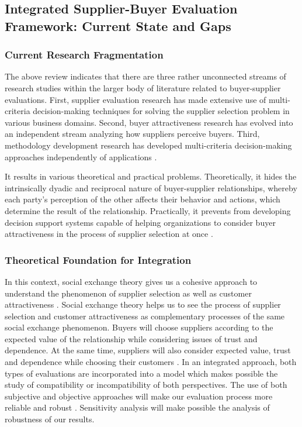 \documentclass[11pt]{article}
\begin{document}
\subsection{Integrated Supplier-Buyer Evaluation Framework: Current State and Gaps}

\subsubsection{Current Research Fragmentation}

The above review indicates that there are three rather unconnected streams of research studies within the larger body of literature related to buyer-supplier evaluations. First, supplier evaluation research has made extensive use of multi-criteria decision-making techniques for solving the supplier selection problem in various business domains. Second, buyer attractiveness research has evolved into an independent stream analyzing how suppliers perceive buyers. Third, methodology development research has developed multi-criteria decision-making approaches independently of applications \cite{ref22,ref32,ref35}.

It results in various theoretical and practical problems. Theoretically, it hides the intrinsically dyadic and reciprocal nature of buyer-supplier relationships, whereby each party's perception of the other affects their behavior and actions, which determine the result of the relationship. Practically, it prevents from developing decision support systems capable of helping organizations to consider buyer attractiveness in the process of supplier selection at once \cite{ref34,ref14}.

\subsubsection{Theoretical Foundation for Integration}

In this context, social exchange theory gives us a cohesive approach to understand the phenomenon of supplier selection as well as customer attractiveness \cite{ref33,ref34}. Social exchange theory helps us to see the process of supplier selection and customer attractiveness as complementary processes of the same social exchange phenomenon. Buyers will choose suppliers according to the expected value of the relationship while considering issues of trust and dependence. At the same time, suppliers will also consider expected value, trust and dependence while choosing their customers \cite{ref14}. In an integrated approach, both types of evaluations are incorporated into a model which makes possible the study of compatibility or incompatibility of both perspectives. The use of both subjective and objective approaches will make our evaluation process more reliable and robust \cite{ref36}. Sensitivity analysis will make possible the analysis of robustness of our results.
\end{document}
